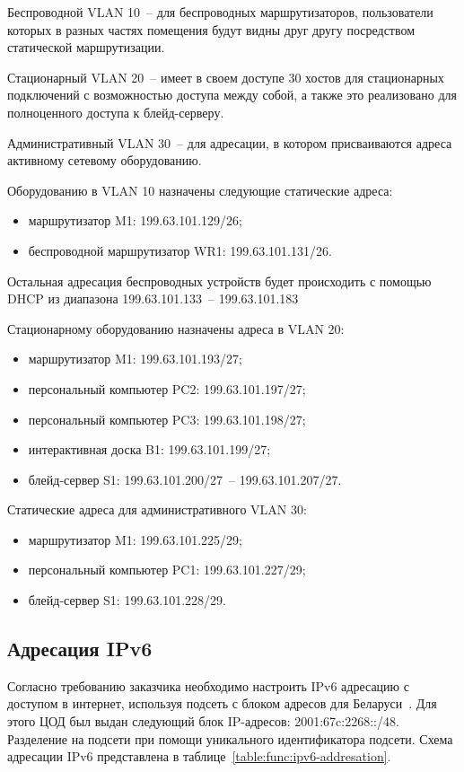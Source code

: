 Беспроводной VLAN 10~-- для беспроводных маршрутизаторов, пользователи которых в разных частях помещения будут видны друг другу посредством статической маршрутизации. 

Стационарный VLAN 20~-- имеет в своем доступе 30 хостов для стационарных подключений с возможностью доступа между собой, а также это реализовано для полноценного доступа к блейд-серверу. 

Административный VLAN 30~-- для адресации, в котором присваиваются адреса активному сетевому оборудованию.

Оборудованию в VLAN 10 назначены следующие статические адреса:
\begin{itemize}
    \item маршрутизатор M1: 199.63.101.129/26;
    \item беспроводной маршрутизатор WR1: 199.63.101.131/26.
\end{itemize}
Остальная адресация беспроводных устройств будет происходить с помощью DHCP из диапазона 199.63.101.133~-- 199.63.101.183

Стационарному оборудованию назначены адреса в VLAN 20:
\begin{itemize}
    \item маршрутизатор M1: 199.63.101.193/27;
    \item персональный компьютер PC2: 199.63.101.197/27;
    \item персональный компьютер PC3: 199.63.101.198/27;
    \item интерактивная доска B1: 199.63.101.199/27;
    \item блейд-сервер S1: 199.63.101.200/27~-- 199.63.101.207/27.
\end{itemize}

Статические адреса для административного VLAN 30:
\begin{itemize}
    \item маршрутизатор M1: 199.63.101.225/29;
    \item персональный компьютер PC1: 199.63.101.227/29;
    \item блейд-сервер S1: 199.63.101.228/29.
\end{itemize}


\subsection{Адресация IPv6}

Согласно требованию заказчика необходимо настроить IPv6 адресацию с доступом в интернет, используя подсеть с блоком адресов для Беларуси~\cite{adresses_rb}. Для этого ЦОД был выдан следующий блок IP-адресов: 2001:67c:2268::/48. Разделение на подсети при помощи уникального идентификатора подсети. Схема адресации IPv6 представлена в таблице~\ref{table:func:ipv6-addresation}.


